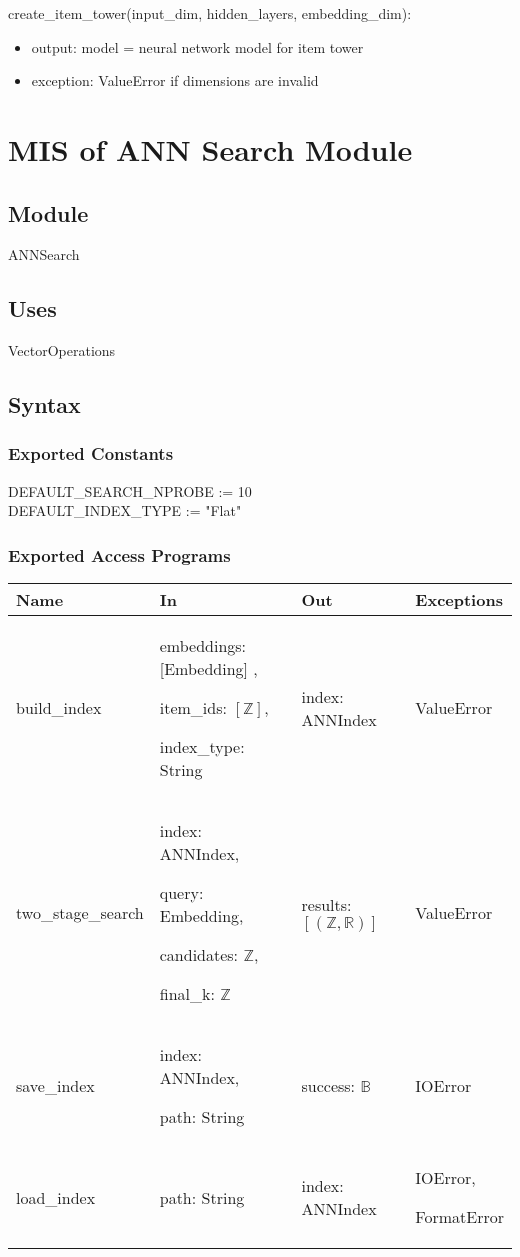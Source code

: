 \documentclass[12pt, titlepage]{article}
\begin{document}
\noindent create\_item\_tower(input\_dim, hidden\_layers, embedding\_dim):
\begin{itemize}
\item output: model = neural network model for item tower
\item exception: ValueError if dimensions are invalid
\end{itemize}

\section{MIS of ANN Search Module} \label{ModuleANN}

\subsection{Module}

ANNSearch

\subsection{Uses}
VectorOperations

\subsection{Syntax}

\subsubsection{Exported Constants}
DEFAULT\_SEARCH\_NPROBE := 10\\
DEFAULT\_INDEX\_TYPE := "Flat"
\subsubsection{Exported Access Programs}

\begin{center}
  \begin{tabular}{p{4cm} p{4cm} p{4cm} p{3cm}}
  \hline
  \textbf{Name} & \textbf{In} & \textbf{Out} & \textbf{Exceptions} \\
  \hline
  build\_index & embeddings: [Embedding] ,
  
  item\_ids: $[\mathbb{Z}]$,
  
  index\_type: String & index: ANNIndex & ValueError \\
  \hline
  two\_stage\_search & index: ANNIndex,
  
  query: Embedding,
  
  candidates: $\mathbb{Z}$,
  
  final\_k: $\mathbb{Z}$
   & results: $[(\mathbb{Z}, \mathbb{R})]$ & ValueError \\
  \hline
  save\_index & index: ANNIndex, 
  
  path: String & success: $\mathbb{B}$ & IOError \\
  \hline
  load\_index & path: String 
   & index: ANNIndex & IOError, 
   
   FormatError \\
  \hline
  \end{tabular}
  \end{center}
\end{document}
